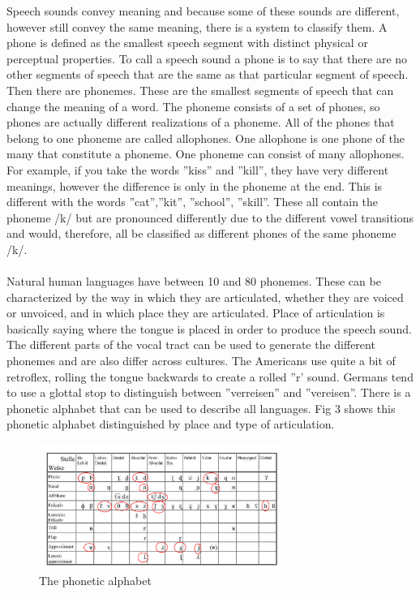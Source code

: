 Speech sounds convey meaning and because some of these sounds are different, however still convey the same meaning, there is a system to classify them. A phone is defined as the smallest speech segment with distinct physical or perceptual properties. To call a speech sound a phone is to say that there are no other segments of speech that are the same as that particular segment of speech.  Then there are phonemes.  These are the smallest segments of speech that can change the meaning of a word.  The phoneme consists of a set of phones, so phones are actually different realizations of a phoneme. All of the phones that belong to one phoneme are called allophones. One allophone is one phone of the many that constitute a phoneme. One phoneme can consist of many allophones.  For example, if you take the words ''kiss'' and ''kill'', they have very different meanings, however the difference is only in the phoneme at the end.  This is different with the words  ''cat'',''kit'', ''school'', ''skill''.  These all contain the phoneme /k/ but are pronounced differently due to the different vowel transitions and would, therefore, all be classified as different phones of the same phoneme /k/.\\
\\
Natural human languages have between 10 and 80 phonemes. These can be characterized by the way in which they are articulated, whether they are voiced or unvoiced, and in which place they are articulated.  Place of articulation is basically saying where the tongue is placed in order to produce the speech sound. The different parts of the vocal tract can be used to generate the different phonemes and are also differ across cultures.  The Americans use quite a bit of retroflex, rolling the tongue backwards to create a rolled  ''r' sound. Germans tend to use a glottal stop to distinguish between ''verreisen'' and ''vereisen''. There is a phonetic alphabet that can be used to describe all languages. Fig 3 shows this phonetic alphabet distinguished by place and type of articulation.\\

\begin{figure}
    \includegraphics[width=0.7\textwidth]{Pictures/Chapter1_Lesson2/intPhonAlphabet_konsonanten_english2-eps-converted-to.pdf}
    \caption{The phonetic alphabet}
\end{figure}

